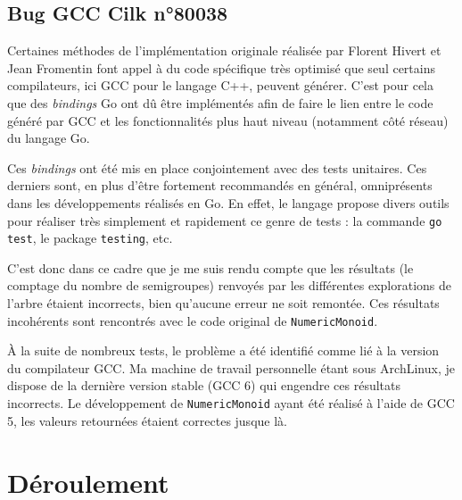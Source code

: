 \documentclass[12pt,a4paper]{article}
\begin{document}
\subsection*{Bug GCC Cilk n°80038}
Certaines méthodes de l'implémentation originale réalisée par Florent Hivert et Jean Fromentin font appel à du code spécifique très optimisé que seul certains compilateurs, ici GCC pour le langage C++, peuvent générer. C'est pour cela que des \emph{bindings} Go ont dû être implémentés afin de faire le lien entre le code généré par GCC et les fonctionnalités plus haut niveau (notamment côté réseau) du langage Go.

Ces \emph{bindings} ont été mis en place conjointement avec des tests unitaires. Ces derniers sont, en plus d'être fortement recommandés en général, omniprésents dans les développements réalisés en Go. En effet, le langage propose divers outils pour réaliser très simplement et rapidement ce genre de tests : la commande \texttt{go test}, le package \texttt{testing}, etc.

C'est donc dans ce cadre que je me suis rendu compte que les résultats (le comptage du nombre de semigroupes) renvoyés par les différentes explorations de l'arbre étaient incorrects, bien qu'aucune erreur ne soit remontée. Ces résultats incohérents sont rencontrés avec le code original de \texttt{NumericMonoid}.

À la suite de nombreux tests, le problème a été identifié comme lié à la version du compilateur GCC. Ma machine de travail personnelle étant sous ArchLinux, je dispose de la dernière version stable (GCC 6) qui engendre ces résultats incorrects. Le développement de \texttt{NumericMonoid} ayant été réalisé à l'aide de GCC 5, les valeurs retournées étaient correctes jusque là.

\section*{Déroulement}
\end{document}
